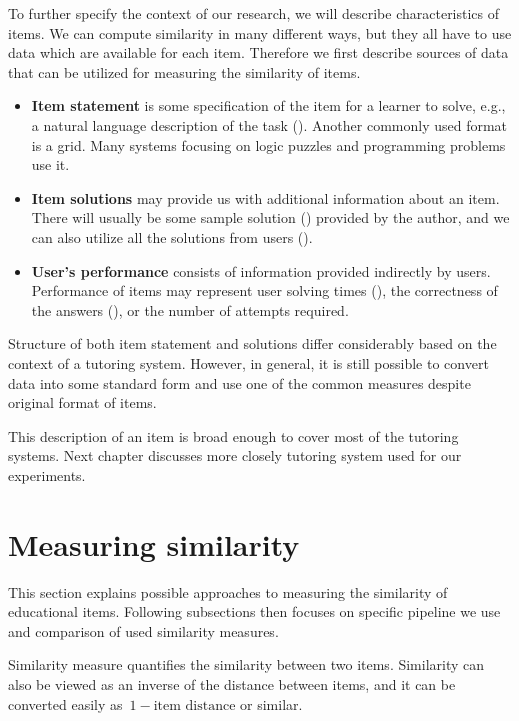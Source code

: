 \documentclass[
  printed, %
  table,   %
  nolof,     %
  nolot,     %
  color,
  final,
  nocover
]{fithesis3}
\begin{document}

To further specify the context of our research, we will describe characteristics of items. We can compute similarity in many different ways, but they all have to use data which are available for each item. Therefore we first describe sources of data that can be utilized for measuring the similarity of items.

\begin{itemize}
\item
  \textbf{Item statement} is some specification of the item for a learner to solve, e.g., a natural language description of the task (). Another commonly used format is a grid. Many systems focusing on logic puzzles and programming problems use it.
\item
  \textbf{Item solutions} may provide us with additional information about an item. There will usually be some sample solution () provided by the author, and we can also utilize all the solutions from users ().
\item
  \textbf{User's performance} consists of information provided indirectly by users. Performance of items may represent user solving times (), the correctness of the answers (), or the number of attempts required.
\end{itemize}

Structure of both item statement and solutions differ considerably based on the context of a tutoring system. However, in general, it is still possible to convert data into some standard form and use one of the common measures despite original format of items.

This description of an item is broad enough to cover most of the tutoring systems. Next chapter discusses more closely tutoring system used for our experiments.


\section{Measuring similarity}\label{measuring-similarity}

This section explains possible approaches to measuring the similarity of educational items. Following subsections then focuses on specific pipeline we use and comparison of used similarity measures.

Similarity measure quantifies the similarity between two items. Similarity can also be viewed as an inverse of the distance between items, and it can be converted easily as~$1 - \text{item distance}$ or similar.
\end{document}
